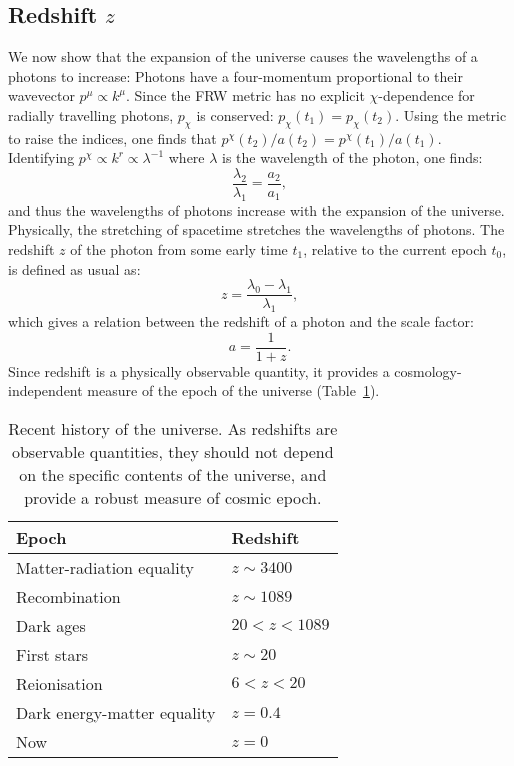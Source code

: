 \subsection{Redshift $z$}
We now show that the expansion of the universe causes the wavelengths of a photons to increase: Photons have a four-momentum proportional to their wavevector $p^\mu \propto k^\mu$. Since the FRW metric has no explicit $\chi$-dependence for radially travelling photons, $p_\chi$ is conserved: $p_\chi(t_1) = p_\chi(t_2)$. Using the metric to raise the indices, one finds that $p^\chi(t_2)/a(t_2)=p^\chi(t_1)/a(t_1)$. Identifying ${p^\chi \propto k^r \propto \lambda^{-1}}$ where $\lambda$ is the wavelength of the photon, one finds:
\begin{equation}
  \frac{\lambda_2}{\lambda_1} = \frac{a_2}{a_1},
\end{equation}
and thus the wavelengths of photons increase with the expansion of the universe. Physically, the stretching of spacetime stretches the wavelengths of photons.
The redshift $z$ of the photon from some early time $t_1$, relative to the current epoch $t_0$, is defined as usual as:
\begin{equation}
  z = \frac{\lambda_0-\lambda_1}{\lambda_1},
\end{equation}
which gives a relation between the redshift of a photon and the scale factor:
\begin{equation}
  a = \frac{1}{1+z}.
\end{equation}
Since redshift is a physically observable quantity, it provides a cosmology-independent measure of the epoch of the universe (Table~\ref{tab:cos:universe_timeline}).
\begin{table}
  \centering
\begin{tabular}{ll}
 \toprule
  Epoch & Redshift \\
 \midrule
 \midrule
 Matter-radiation equality &
 $z\sim3400$
 \\
 Recombination &
 $z\sim1089$
 \\
 Dark ages &
 $20<z<1089$
 \\
 First stars &
 $z\sim20$
 \\
 Reionisation &
 $6<z<20$
 \\
 Dark energy-matter equality &
 $z=0.4$
 \\
 Now &
 $z=0$
 \\
 \bottomrule
\end{tabular}
\caption{Recent history of the universe. As redshifts are observable quantities, they should not depend on the specific contents of the universe, and provide a robust measure of cosmic epoch.}\label{tab:cos:universe_timeline}
\end{table}

